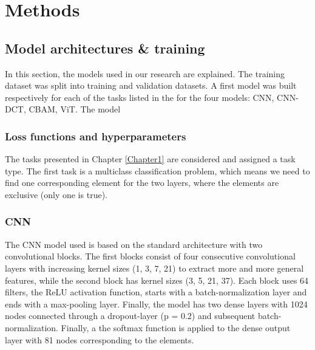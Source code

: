 
\chapter{Methods} %

\label{Chapter3} %







\section{Model architectures \& training}
In this section, the models used in our research are explained.
The training dataset was split into training and validation datasets. A first model was built respectively for each of the tasks listed in the  for the four models: CNN, CNN-DCT, CBAM, ViT. The model 

\subsection{Loss functions and hyperparameters}
The tasks presented in Chapter \ref{Chapter1} are considered and assigned a task type.
The first task is a multiclass classification problem, which means we need to find one corresponding element for the two layers, where the elements are exclusive (only one is true).

\subsection{CNN}
The CNN model used is based on the standard architecture with two convolutional blocks. The first blocks consist of four consecutive convolutional layers with increasing kernel sizes (1, 3, 7, 21) to extract more and more general features, while the second block has kernel sizes (3, 5, 21, 37). Each block uses 64 filters, the ReLU activation function, starts with a batch-normalization layer and ends with a max-pooling layer. Finally, the model has two dense layers with 1024 nodes connected through a dropout-layer (p = 0.2) and subsequent batch-normalization. Finally, a the softmax function is applied to the dense output layer with 81 nodes corresponding to the elements.


